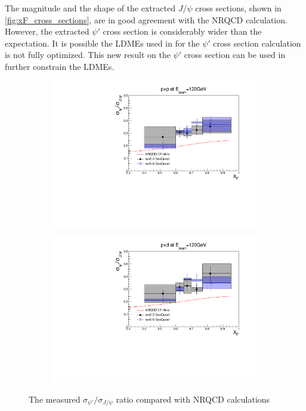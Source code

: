 \documentclass[reprint,aps,unsortedaddress,superscriptaddress,prd,floatfix,showpacs,linenumbers]{revtex4-2}
\begin{document}
The magnitude and the shape of the extracted $J/\psi$ cross sections,
shown in \cref{fig:xF_cross_sections}, are in good agreement with the NRQCD calculation. 
However, the extracted $\psi'$ cross section is considerably wider than the expectation.
It is possible the LDMEs used in for the $\psi'$ cross section calculation is not fully optimized.
This new result on the $\psi'$ cross section can be used in further constrain the LDMEs. 

\begin{figure}[h]
	\begin{subfigure}{0.45\linewidth}
		\includegraphics[width=\linewidth]{figures/crossSections/xF/ratio_xF_LH2_5-6_5770}
	\end{subfigure}
	\begin{subfigure}{0.45\linewidth}
		\includegraphics[width=\linewidth]{figures/crossSections/xF/ratio_xF_LD2_5-6_5770}
	\end{subfigure}
	\caption{The measured $\sigma_{\psi'}/\sigma_{J/\psi}$ ratio compared with NRQCD calculations}
	\label{fig:psip_jpsi_ratio_xF}
\end{figure}
\end{document}
